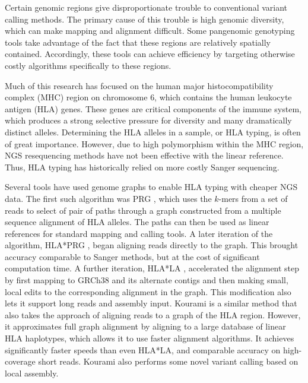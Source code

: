 Certain genomic regions give disproportionate trouble to conventional variant calling methods. 
The primary cause of this trouble is high genomic diversity, which can make mapping and alignment difficult. 
Some pangenomic genotyping tools take advantage of the fact that these regions are relatively spatially contained. 
Accordingly, these tools can achieve efficiency by targeting otherwise costly algorithms specifically to these regions.

Much of this research has focused on the human major histocompatibility complex (MHC) region on chromosome 6, which contains the human leukocyte antigen (HLA) genes. 
These genes are critical components of the immune system, which produces a strong selective pressure for diversity and many dramatically distinct alleles.
Determining the HLA alleles in a sample, or HLA typing, is often of great importance. 
However, due to high polymorphism within the MHC region, NGS resequencing methods have not been effective with the linear reference.
Thus, HLA typing has historically relied on more costly Sanger sequencing.

Several tools have used genome graphs to enable HLA typing with cheaper NGS data.
The first such algorithm was PRG \cite{dilthey2015improved}, which uses the $k$-mers from a set of reads to select of pair of paths through a graph constructed from a multiple sequence alignment of HLA alleles.
The paths can then be used as linear references for standard mapping and calling tools.
A later iteration of the algorithm, HLA*PRG \cite{dilthey2018hla}, began aligning reads directly to the graph.
This brought accuracy comparable to Sanger methods, but at the cost of significant computation time.
A further iteration, HLA*LA \cite{dilthey2019hla}, accelerated the alignment step by first mapping to GRCh38 and its alternate contigs and then making small, local edits to the corresponding alignment in the graph.
This modification also lets it support long reads and assembly input.
Kourami \cite{lee2018kourami} is a similar method that also takes the approach of aligning reads to a graph of the HLA region.
However, it approximates full graph alignment by aligning to a large database of linear HLA haplotypes, which allows it to use faster alignment algorithms.
It achieves significantly faster speeds than even HLA*LA, and comparable accuracy on high-coverage short reads.
Kourami also performs some novel variant calling based on local assembly.

